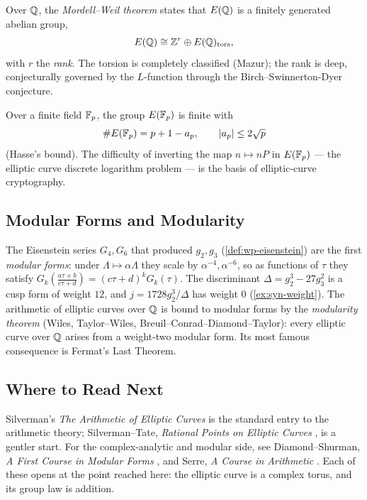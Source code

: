 Over \(\mathbb{Q}\), the \emph{Mordell--Weil theorem} states that \(E(\mathbb{Q})\) is a finitely
generated abelian group,
\[
  E(\mathbb{Q}) \cong \mathbb{Z}^r \oplus E(\mathbb{Q})_{\mathrm{tors}},
\]
with \(r\) the \emph{rank}. The torsion is completely classified (Mazur); the rank
is deep, conjecturally governed by the \(L\)-function through the
Birch--Swinnerton-Dyer conjecture.

Over a finite field \(\mathbb{F}_p\), the group \(E(\mathbb{F}_p)\) is finite with
\[
  \#E(\mathbb{F}_p) = p + 1 - a_p, \qquad |a_p| \le 2\sqrt p
\]
(Hasse's bound). The difficulty of inverting the map \(n \mapsto nP\) in
\(E(\mathbb{F}_p)\) --- the elliptic curve discrete logarithm problem --- is the basis of
elliptic-curve cryptography.

\subsection{Modular Forms and Modularity}
\label{sec:syn-modular}

The Eisenstein series \(G_4, G_6\) that produced \(g_2, g_3\)
(\cref{def:wp-eisenstein}) are the first \emph{modular forms}: under
\(\Lambda \mapsto \alpha\Lambda\) they scale by \(\alpha^{-4}, \alpha^{-6}\), so as
functions of \(\tau\) they satisfy \(G_k(\tfrac{a\tau+b}{c\tau+d}) =
(c\tau+d)^k G_k(\tau)\). The discriminant \(\Delta = g_2^3 - 27g_3^2\) is a cusp
form of weight \(12\), and \(j = 1728 g_2^3/\Delta\) has weight \(0\)
(\cref{ex:syn-weight}). The arithmetic of elliptic curves over \(\mathbb{Q}\) is bound to
modular forms by the \emph{modularity theorem} (Wiles, Taylor--Wiles,
Breuil--Conrad--Diamond--Taylor): every elliptic curve over \(\mathbb{Q}\) arises from a
weight-two modular form. Its most famous consequence is Fermat's Last Theorem.

\subsection{Where to Read Next}
\label{sec:syn-reading}

Silverman's \emph{The Arithmetic of Elliptic Curves} \cite{silverman} is the
standard entry to the arithmetic theory; Silverman--Tate, \emph{Rational Points on
Elliptic Curves} \cite{silverman-tate}, is a gentler start. For the
complex-analytic and modular side, see Diamond--Shurman, \emph{A First Course in
Modular Forms} \cite{diamond-shurman}, and Serre, \emph{A Course in Arithmetic}
\cite{serre}. Each of these opens at the point reached here: the elliptic curve is
a complex torus, and its group law is addition.

